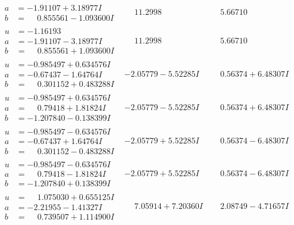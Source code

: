 \documentclass[1p]{elsarticle_modified}
\theoremstyle{definition}
\begin{document}
$$\begin{array}{c|c|c}
\begin{aligned}
a &= -1.91107 + 3.18977 I \\
b &= \phantom{-}0.855561 - 1.093600 I\end{aligned}
 & \phantom{-}11.2998\phantom{ +0.000000I} & \phantom{-}5.66710\phantom{ +0.000000I} \\ \hline\begin{aligned}
u &= -1.16193\phantom{ +0.000000I} \\
a &= -1.91107 - 3.18977 I \\
b &= \phantom{-}0.855561 + 1.093600 I\end{aligned}
 & \phantom{-}11.2998\phantom{ +0.000000I} & \phantom{-}5.66710\phantom{ +0.000000I} \\ \hline\begin{aligned}
u &= -0.985497 + 0.634576 I \\
a &= -0.67437 - 1.64764 I \\
b &= \phantom{-}0.301152 + 0.483288 I\end{aligned}
 & -2.05779 - 5.52285 I & \phantom{-}0.56374 + 6.48307 I \\ \hline\begin{aligned}
u &= -0.985497 + 0.634576 I \\
a &= \phantom{-}0.79418 + 1.81824 I \\
b &= -1.207840 - 0.138399 I\end{aligned}
 & -2.05779 - 5.52285 I & \phantom{-}0.56374 + 6.48307 I \\ \hline\begin{aligned}
u &= -0.985497 - 0.634576 I \\
a &= -0.67437 + 1.64764 I \\
b &= \phantom{-}0.301152 - 0.483288 I\end{aligned}
 & -2.05779 + 5.52285 I & \phantom{-}0.56374 - 6.48307 I \\ \hline\begin{aligned}
u &= -0.985497 - 0.634576 I \\
a &= \phantom{-}0.79418 - 1.81824 I \\
b &= -1.207840 + 0.138399 I\end{aligned}
 & -2.05779 + 5.52285 I & \phantom{-}0.56374 - 6.48307 I \\ \hline\begin{aligned}
u &= \phantom{-}1.075030 + 0.655125 I \\
a &= -2.21955 - 1.41327 I \\
b &= \phantom{-}0.739507 + 1.114900 I\end{aligned}
 & \phantom{-}7.05914 + 7.20360 I & \phantom{-}2.08749 - 4.71657 I \\ \hline\begin{aligned}

\end{aligned}
\end{array}$$
\end{document}
